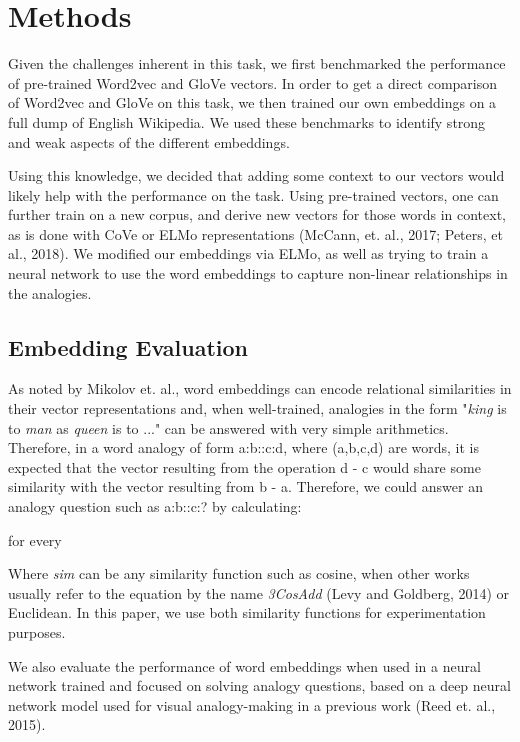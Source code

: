 \documentclass[11pt]{article}
\begin{document}
\section{Methods}

Given the challenges inherent in this task, we first benchmarked the
performance of pre-trained Word2vec and GloVe vectors. In order to get a
direct comparison of Word2vec and GloVe on this task, we then trained
our own embeddings on a full dump of English Wikipedia. We used these
benchmarks to identify strong and weak aspects of the different
embeddings.

Using this knowledge, we decided that adding some context to our vectors would
likely help with the performance on the task. Using pre-trained vectors, one can
further train on a new corpus, and derive new vectors for those words in
context, as is done with CoVe or ELMo representations (McCann, et. al., 2017;
Peters, et al., 2018). We modified our embeddings via ELMo, as well as trying to
train a neural network to use the word embeddings to capture non-linear
relationships in the analogies.

\subsection{Embedding Evaluation}

As noted by Mikolov et. al., word embeddings can encode relational similarities
in their vector representations and, when well-trained, analogies in the form
"\emph{king }is to \emph{man }as \emph{queen }is to ..." can be answered with
very simple arithmetics. Therefore, in a word analogy of form a:b::c:d, where
(a,b,c,d) are words, it is expected that the vector resulting from the operation
d - c would share some similarity with the vector resulting from b - a.
Therefore, we could answer an analogy question such as a:b::c:? by calculating:

for every

Where \emph{sim }can be any similarity function such as cosine, when
other works usually refer to the equation by the name \emph{3CosAdd}
(Levy and Goldberg, 2014) or Euclidean. In this paper, we use both
similarity functions for experimentation purposes.

We also evaluate the performance of word embeddings when used in a
neural network trained and focused on solving analogy questions, based
on a deep neural network model used for visual analogy-making in a
previous work (Reed et. al., 2015).
\end{document}
